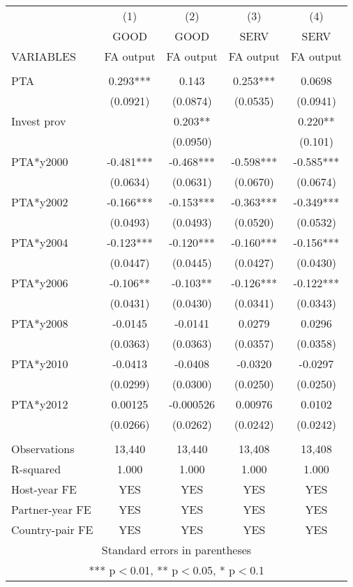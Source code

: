 \begin{tabular}{lcccc} \hline
 & (1) & (2) & (3) & (4) \\
 & GOOD & GOOD & SERV & SERV \\
VARIABLES & FA output & FA output & FA output & FA output \\ \hline
 &  &  &  &  \\
PTA & 0.293*** & 0.143 & 0.253*** & 0.0698 \\
 & (0.0921) & (0.0874) & (0.0535) & (0.0941) \\
Invest prov &  & 0.203** &  & 0.220** \\
 &  & (0.0950) &  & (0.101) \\
PTA*y2000 & -0.481*** & -0.468*** & -0.598*** & -0.585*** \\
 & (0.0634) & (0.0631) & (0.0670) & (0.0674) \\
PTA*y2002 & -0.166*** & -0.153*** & -0.363*** & -0.349*** \\
 & (0.0493) & (0.0493) & (0.0520) & (0.0532) \\
PTA*y2004 & -0.123*** & -0.120*** & -0.160*** & -0.156*** \\
 & (0.0447) & (0.0445) & (0.0427) & (0.0430) \\
PTA*y2006 & -0.106** & -0.103** & -0.126*** & -0.122*** \\
 & (0.0431) & (0.0430) & (0.0341) & (0.0343) \\
PTA*y2008 & -0.0145 & -0.0141 & 0.0279 & 0.0296 \\
 & (0.0363) & (0.0363) & (0.0357) & (0.0358) \\
PTA*y2010 & -0.0413 & -0.0408 & -0.0320 & -0.0297 \\
 & (0.0299) & (0.0300) & (0.0250) & (0.0250) \\
PTA*y2012 & 0.00125 & -0.000526 & 0.00976 & 0.0102 \\
 & (0.0266) & (0.0262) & (0.0242) & (0.0242) \\
 &  &  &  &  \\
Observations & 13,440 & 13,440 & 13,408 & 13,408 \\
R-squared & 1.000 & 1.000 & 1.000 & 1.000 \\
Host-year FE & YES & YES & YES & YES \\
Partner-year FE & YES & YES & YES & YES \\
 Country-pair FE & YES & YES & YES & YES \\ \hline
\multicolumn{5}{c}{ Standard errors in parentheses} \\
\multicolumn{5}{c}{ *** p$<$0.01, ** p$<$0.05, * p$<$0.1} \\
\end{tabular}
